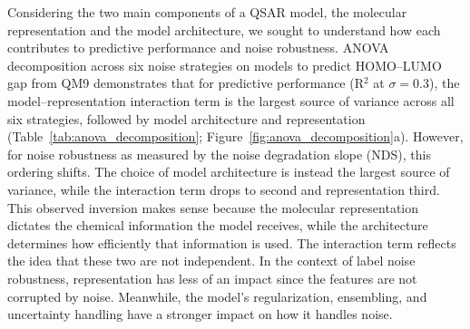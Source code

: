 

Considering the two main components of a QSAR model, the molecular representation and the model architecture, we sought to understand how each contributes to predictive performance and noise robustness. ANOVA decomposition across six noise strategies on models to predict HOMO--LUMO gap from QM9 demonstrates that for predictive performance (R$^2$ at $\sigma = 0.3$), the model--representation interaction term is the  largest source of variance across all six strategies, followed by model architecture and representation (Table~\ref{tab:anova_decomposition}; Figure~\ref{fig:anova_decomposition}a). However, for noise robustness as measured by the noise degradation slope (NDS), this ordering shifts. The choice of model architecture is instead the largest source of variance, while the interaction term drops to second and representation third. This observed inversion makes sense because the molecular representation dictates the chemical information the model receives, while the architecture determines how efficiently that information is used. The interaction term reflects the idea that these two are not independent. In the context of label noise robustness, representation has less of an impact since the features are not corrupted by noise. Meanwhile, the model's regularization, ensembling, and uncertainty handling have a stronger impact on how it handles noise. 

